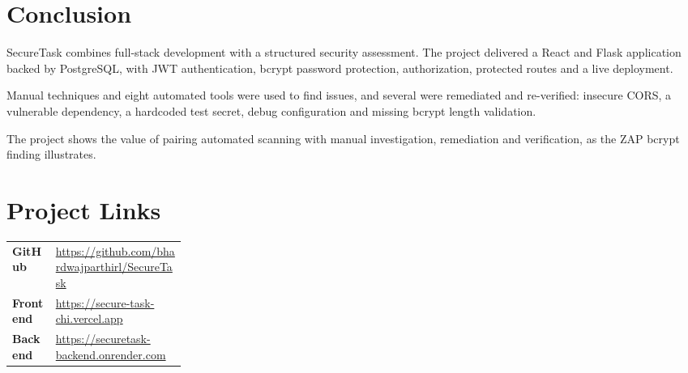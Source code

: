 \documentclass[11pt,a4paper]{article}
\begin{document}
\section{Conclusion}

SecureTask combines full-stack development with a structured security assessment. The project delivered a React and Flask application backed by PostgreSQL, with JWT authentication, bcrypt password protection, authorization, protected routes and a live deployment.

Manual techniques and eight automated tools were used to find issues, and several were remediated and re-verified: insecure CORS, a vulnerable dependency, a hardcoded test secret, debug configuration and missing bcrypt length validation.

The project shows the value of pairing automated scanning with manual investigation, remediation and verification, as the ZAP bcrypt finding illustrates.

\section{Project Links}

\begin{tabularx}{\linewidth}{@{}L{0.25\linewidth}X@{}}
\textbf{GitHub} & \url{https://github.com/bhardwajparthirl/SecureTask} \\
\textbf{Frontend} & \url{https://secure-task-chi.vercel.app} \\
\textbf{Backend} & \url{https://securetask-backend.onrender.com} \\
\end{tabularx}
\end{document}

